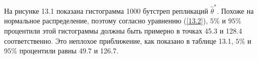 \begin{figure}[H]
\end{figure}

На рисунке 13.1 показана гистограмма 1000 бутстреп репликаций $\widehat{\theta}^{*}$. Похоже на нормальное распределение, поэтому согласно уравнению (\ref{13.2}), $5\%$ и $95\%$ процентили этой гистограммы должны быть примерно в точках 45.3 и 128.4 соответственно. Это неплохое приближение, как показано в таблице 13.1, $5\%$ и $95\%$ процентили равны 49.7 и 126.7.
\begin{figure}[H]
\end{figure}